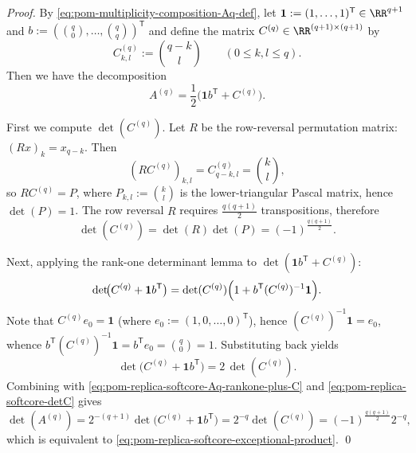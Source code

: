 \begin{proof}
By \eqref{eq:pom-multiplicity-composition-Aq-def}, let
\(
\mathbf{1}:=(1,\dots,1)^{\mathsf T}\in\RR^{q+1}
\)
and
\(
b:=(\binom{q}{0},\dots,\binom{q}{q})^{\mathsf T}
\)
and define the matrix \(C^{(q)}\in\RR^{(q+1)\times(q+1)}\) by
\[
C^{(q)}_{k,l}:=\binom{q-k}{l}\qquad(0\le k,l\le q).
\]
Then we have the decomposition
\begin{equation}\label{eq:pom-replica-softcore-Aq-rankone-plus-C}
A^{(q)}=\frac12\bigl(\mathbf{1}b^{\mathsf T}+C^{(q)}\bigr).
\end{equation}
\par
First we compute \(\det(C^{(q)})\).
Let \(R\) be the row-reversal permutation matrix: \((Rx)_k=x_{q-k}\).
Then
\[
(RC^{(q)})_{k,l}=C^{(q)}_{q-k,l}=\binom{k}{l},
\]
so \(RC^{(q)}=P\), where \(P_{k,l}:=\binom{k}{l}\) is the lower-triangular Pascal matrix, hence \(\det(P)=1\).
The row reversal \(R\) requires \(\frac{q(q+1)}{2}\) transpositions, therefore
\begin{equation}\label{eq:pom-replica-softcore-detC}
\det(C^{(q)})=\det(R)\det(P)=(-1)^{\frac{q(q+1)}{2}}.
\end{equation}
\par
Next, applying the rank-one determinant lemma to \(\det(\mathbf{1}b^{\mathsf T}+C^{(q)})\):
\[
\det\!\bigl(C^{(q)}+\mathbf{1}b^{\mathsf T}\bigr)=\det(C^{(q)})\Bigl(1+b^{\mathsf T}(C^{(q)})^{-1}\mathbf{1}\Bigr).
\]
Note that \(C^{(q)}e_0=\mathbf{1}\) (where \(e_0:=(1,0,\dots,0)^{\mathsf T}\)), hence \((C^{(q)})^{-1}\mathbf{1}=e_0\), whence
\(
b^{\mathsf T}(C^{(q)})^{-1}\mathbf{1}=b^{\mathsf T}e_0=\binom{q}{0}=1
\).
Substituting back yields
\[
\det\!\bigl(C^{(q)}+\mathbf{1}b^{\mathsf T}\bigr)=2\,\det(C^{(q)}).
\]
Combining with \eqref{eq:pom-replica-softcore-Aq-rankone-plus-C} and \eqref{eq:pom-replica-softcore-detC} gives
\[
\det(A^{(q)})
=2^{-(q+1)}\det\!\bigl(C^{(q)}+\mathbf{1}b^{\mathsf T}\bigr)
=2^{-q}\det(C^{(q)})
=(-1)^{\frac{q(q+1)}{2}}2^{-q},
\]
which is equivalent to \eqref{eq:pom-replica-softcore-exceptional-product}. \qed
\end{proof}

